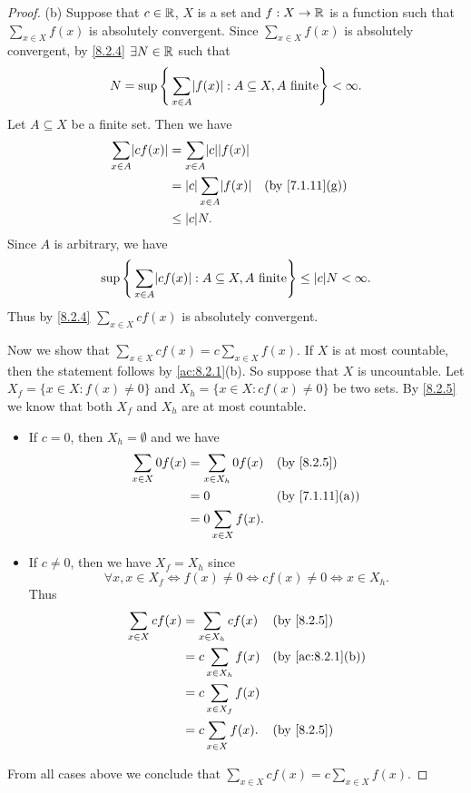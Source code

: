 \begin{proof}{(b)}
  Suppose that \(c \in \mathbb{R}\), \(X\) is a set and \(f : X \to \mathbb{R}\) is a function such that \(\sum_{x \in X} f(x)\) is absolutely convergent.
  Since \(\sum_{x \in X} f(x)\) is absolutely convergent, by \cref{8.2.4} \(\exists N \in \mathbb{R}\) such that
  \[
    N = \sup\Bigg\{\sum_{x \in A} \abs{f(x)} : A \subseteq X, A \text{ finite}\Bigg\} < \infty.
  \]
  Let \(A \subseteq X\) be a finite set.
  Then we have
  \begin{align*}
    \sum_{x \in A} \abs{cf(x)} & = \sum_{x \in A} \abs{c}\abs{f(x)}                                   \\
                               & = \abs{c}\sum_{x \in A} \abs{f(x)} &  & \text{(by \cref{7.1.11}(g))} \\
                               & \leq \abs{c} N.
  \end{align*}
  Since \(A\) is arbitrary, we have
  \[
    \sup\Bigg\{\sum_{x \in A} \abs{cf(x)} : A \subseteq X, A \text{ finite}\Bigg\} \leq \abs{c}N < \infty.
  \]
  Thus by \cref{8.2.4} \(\sum_{x \in X} cf(x)\) is absolutely convergent.

  Now we show that \(\sum_{x \in X} cf(x) = c \sum_{x \in X} f(x)\).
  If \(X\) is at most countable, then the statement follows by \cref{ac:8.2.1}(b).
  So suppose that \(X\) is uncountable.
  Let \(X_f = \{x \in X : f(x) \neq 0\}\) and \(X_h = \{x \in X : cf(x) \neq 0\}\) be two sets.
  By \cref{8.2.5} we know that both \(X_f\) and \(X_h\) are at most countable.
  \begin{itemize}
    \item If \(c = 0\), then \(X_h = \emptyset\) and we have
          \begin{align*}
            \sum_{x \in X} 0f(x) & = \sum_{x \in X_h} 0f(x) &  & \by{8.2.5}                   \\
                                 & = 0                      &  & \text{(by \cref{7.1.11}(a))} \\
                                 & = 0 \sum_{x \in X} f(x).
          \end{align*}
    \item If \(c \neq 0\), then we have \(X_f = X_h\) since
          \[
            \forall x, x \in X_f \iff f(x) \neq 0 \iff cf(x) \neq 0 \iff x \in X_h.
          \]
          Thus
          \begin{align*}
            \sum_{x \in X} cf(x) & = \sum_{x \in X_h} cf(x)  &  & \by{8.2.5}                     \\
                                 & = c \sum_{x \in X_h} f(x) &  & \text{(by \cref{ac:8.2.1}(b))} \\
                                 & = c \sum_{x \in X_f} f(x)                                     \\
                                 & = c \sum_{x \in X} f(x).  &  & \by{8.2.5}
          \end{align*}
  \end{itemize}
  From all cases above we conclude that \(\sum_{x \in X} cf(x) = c \sum_{x \in X} f(x)\).
\end{proof}

